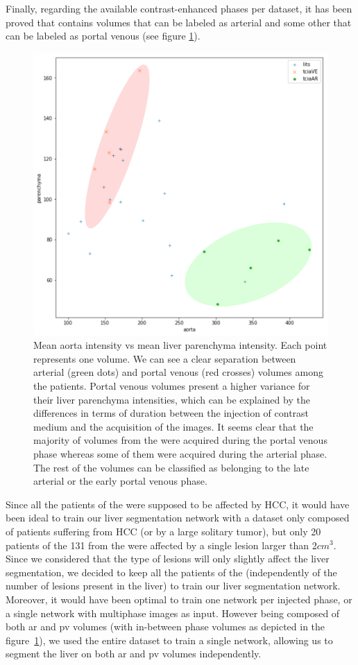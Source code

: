 Finally, regarding the available contrast-enhanced phases per dataset, it has been proved that \textbf{} contains volumes that can be labeled as arterial and some other that can be labeled as portal venous (see figure \ref{fig:LitsTciaPhasePlot}).
\begin{figure}[!ht]
	\centering
	\includegraphics[width=0.6\linewidth]{../Contributions/images/AortaParPlot}
	\caption{Mean aorta intensity vs mean liver parenchyma intensity. Each point represents one volume. We can see a clear separation between arterial (green dots) and portal venous (red crosses) volumes among the \textbf{} patients. Portal venous volumes present a higher variance for their liver parenchyma intensities, which can be explained by the differences in terms of duration between the injection of contrast medium and the acquisition of the images. It seems clear that the majority of volumes from the \textbf{} were acquired during the portal venous phase whereas some of them were acquired during the arterial phase. The rest of the volumes can be classified as belonging to the late arterial or the early portal venous phase.
	}
	\label{fig:LitsTciaPhasePlot}
\end{figure}
Since all the patients of the \textbf{} were supposed to be affected by HCC, it would have been ideal to train our liver segmentation network with a dataset only composed of patients suffering from HCC (or by a large solitary tumor), but only 20 patients of the 131 from the \textbf{} were affected by a single lesion larger than $ 2cm^3 $.
Since we considered that the type of lesions will only slightly affect the liver segmentation, we decided to keep all the patients of the \textbf{} (independently of the number of lesions present in the liver) to train our liver segmentation network.
Moreover, it would have been optimal to train one network per injected phase, or a single network with multiphase images as input.
However \textbf{} being composed of both \ac{ar} and \ac{pv} volumes (with in-between phase volumes as depicted in the figure \ref{fig:LitsTciaPhasePlot}), we used the entire dataset to train a single network, allowing us to segment the liver on both \ac{ar} and \ac{pv} volumes independently.



